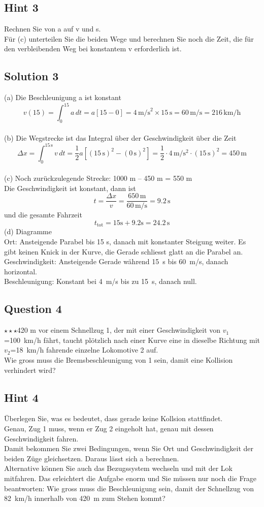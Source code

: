 \documentclass{article}
\begin{document}
\subsection*{Hint 3}
Rechnen Sie von a auf v und s. \\
Für (c) unterteilen Sie die beiden Wege und berechnen Sie noch die Zeit, die für den verbleibenden Weg bei konstantem v erforderlich ist.
\subsection*{Solution 3}
(a) Die Beschleunigung a ist konstant\\\[
v(15) = \int_{0}^{15} a \, dt = a[15 - 0] = 4 \, \text{m/s}^2 \times 15 \, \text{s} = 60 \, \text{m/s} = 216 \, \text{km/h}\]\\(b) Die Wegstrecke ist das Integral über der Geschwindigkeit über die Zeit\\\[
\Delta x = \int_{0}^{15 \, \mathrm{s}} v \, dt = \frac{1}{2} a \left[ (15 \, \mathrm{s})^2 - (0 \, \mathrm{s})^2 \right] = \frac{1}{2} \cdot 4 \, \mathrm{m/s^2} \cdot (15 \, \mathrm{s})^2 = 450 \, \mathrm{m}\] \\
(c) Noch zurückzulegende Strecke: 1000 m – 450 m = 550 m\\Die Geschwindigkeit ist konstant, dann ist
\[
t = \frac{\Delta x}{v} = \frac{650 \, \mathrm{m}}{60 \, \mathrm{m/s}} = 9.2 \, \mathrm{s}
\]
und die gesamte Fahrzeit
\[
t_{\text{tot}} = 15 \mathrm{s} + 9.2 \mathrm{s} = 24.2 \, \mathrm{s}
\]
(d) Diagramme\\
Ort: Ansteigende Parabel bis 15 s, danach mit konstanter Steigung weiter. Es gibt keinen Knick in der Kurve, die Gerade schliesst glatt an die Parabel an.\\
Geschwindigkeit: Ansteigende Gerade während 15~s  bis 60~m/s, danach horizontal.\\
Beschleunigung: Konstant bei 4~m/s bis zu 15~s, danach null.
\subsection*{Question 4}
$\star\star\star$420 m vor einem Schnellzug 1, der mit einer Geschwindigkeit von $v_1$=100~km/h fährt, taucht plötzlich nach einer Kurve eine in dieselbe Richtung mit $v_2$=18~km/h fahrende einzelne Lokomotive 2 auf.\\
Wie gross muss die Bremsbeschleunigung von 1 sein, damit eine Kollision verhindert wird?
\subsection*{Hint 4}
Überlegen Sie, was es bedeutet, dass gerade keine Kollsion stattfindet.\\
Genau, Zug 1 muss, wenn er Zug 2 eingeholt hat, genau mit dessen Geschwindigkeit fahren. \\
Damit bekommen Sie zwei Bedingungen, wenn Sie Ort und Geschwindigkeit der beiden Züge gleichsetzen. Daraus lässt sich a berechnen. \\
Alternative können Sie auch das Bezugssystem wechseln und mit der Lok mitfahren. Das erleichtert die Aufgabe enorm und Sie müssen nur noch die Frage beantworten: Wie gross muss die Beschleunigung sein, damit der Schnellzug von 82~km/h innerhalb von 420~m zum Stehen kommt?
\end{document}
